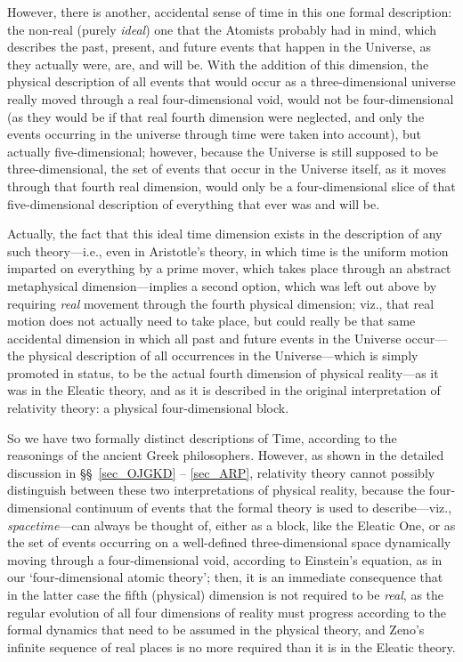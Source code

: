 However, there is another, accidental sense of time in this one formal description: the non-real (purely \textit{ideal}) one that the Atomists probably had in mind, which describes the past, present, and future events that happen in the Universe, as they actually were, are, and will be. With the addition of this dimension, the physical description of all events that would occur as a three-dimensional universe really moved through a real four-dimensional void, would not be four-dimensional (as they would be if that real fourth dimension were neglected, and only the events occurring in the universe through time were taken into account), but actually five-dimensional; however, because the Universe is still supposed to be three-dimensional, the set of events that occur in the Universe itself, as it moves through that fourth real dimension, would only be a four-dimensional slice of that five-dimensional description of everything that ever was and will be.

Actually, the fact that this ideal time dimension exists in the description of any such theory---i.e., even in Aristotle's theory, in which time is the uniform motion imparted on everything by a prime mover, which takes place through an abstract metaphysical dimension---implies a second option, which was left out above by requiring \textit{real} movement through the fourth physical dimension; viz., that real motion does not actually need to take place, but could really be that same accidental dimension in which all past and future events in the Universe occur---the physical description of all occurrences in the Universe---which is simply promoted in status, to be the actual fourth dimension of physical reality---as it was in the Eleatic theory, and as it is described in the original interpretation of relativity theory: a physical four-dimensional block.

So we have two formally distinct descriptions of Time, according to the reasonings of the ancient Greek philosophers. However, as shown in the detailed discussion in \S\S~\ref{sec_OJGKD} -- \ref{sec_ARP}, relativity theory cannot possibly distinguish between these two interpretations of physical reality, because the four-dimensional continuum of events that the formal theory is used to describe---viz., \textit{spacetime}---can always be thought of, either as a block, like the Eleatic One, or as the set of events occurring on a well-defined three-dimensional space dynamically moving through a four-dimensional void, according to Einstein's equation, as in our `four-dimensional atomic theory'; then, it is an immediate consequence that in the latter case the fifth (physical) dimension is not required to be \textit{real}, as the regular evolution of all four dimensions of reality must progress according to the formal dynamics that need to be assumed in the physical theory, and Zeno's infinite sequence of real places is no more required than it is in the Eleatic theory.

